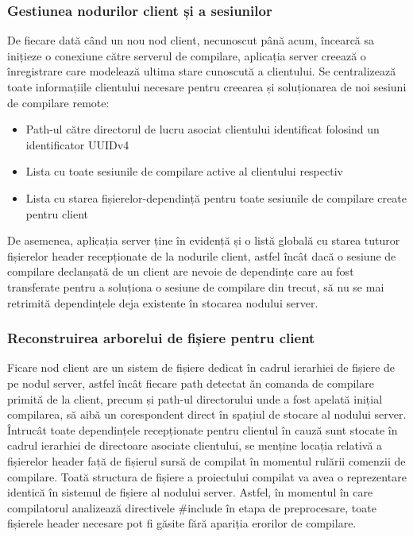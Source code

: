\subsubsection{Gestiunea nodurilor client și a sesiunilor}

De fiecare dată când un nou nod client, necunoscut până acum, încearcă sa inițieze o conexiune către serverul de compilare, aplicația server
creează o înregistrare care modelează ultima stare cunoscută a clientului. Se centralizează toate informațiile clientului necesare pentru creearea și soluționarea
de noi sesiuni de compilare remote:

\begin{itemize}
    \item Path-ul către directorul de lucru asociat clientului identificat folosind un identificator UUIDv4
    \item Lista cu toate sesiunile de compilare active al clientului respectiv
    \item Lista cu starea fișierelor-dependință pentru toate sesiunile de compilare create pentru client
\end{itemize}

De asemenea, aplicația server ține în evidență și o listă globală cu starea tuturor fișierelor header recepționate de la nodurile client, astfel
încât dacă o sesiune de compilare declanșată de un client are nevoie de dependințe care au fost transferate pentru a soluționa o sesiune de compilare 
din trecut, să nu se mai retrimită dependințele deja existente în stocarea nodului server.

\subsubsection{Reconstruirea arborelui de fișiere pentru client}

Ficare nod client are un sistem de fișiere dedicat în cadrul ierarhiei de fișiere de pe nodul server, astfel încât fiecare path detectat ăn comanda de compilare
primită de la client, precum și path-ul directorului unde a fost apelată inițial compilarea, să aibă un corespondent direct în spațiul de stocare al nodului server.
Întrucât toate dependințele recepționate pentru clientul în cauză sunt stocate în cadrul ierarhiei de directoare asociate clientului, se menține locația relativă
a fișierelor header față de fișierul sursă de compilat în momentul rulării comenzii de compilare. Toată structura de fișiere a proiectului compilat 
va avea o reprezentare identică în sistemul de fișiere al nodului server. Astfel, în momentul în care compilatorul 
analizează directivele \#include în etapa de preprocesare, toate fișierele header necesare pot fi găsite fără apariția erorilor de compilare.

